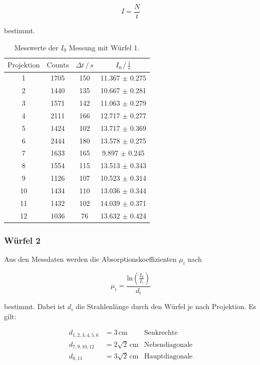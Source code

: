 \begin{equation}
  I = \frac{N}{t}
\end{equation}

\noindent
bestimmt.

\begin{table}
  \centering
  \label{tab:w1}
  \begin{tabular}{c c c c}
  \toprule
  $\text{Projektion}$ & $\text{Counts}$ & $\Delta t \,/\, s $ & $I_0 \,/\, \frac{1}{s} $\\
  \midrule 
    1  & 1705 & 150 & 11.367 $\pm$ 0.275 \\
    2  & 1440 & 135 & 10.667 $\pm$ 0.281 \\
    3  & 1571 & 142 & 11.063 $\pm$ 0.279 \\
    4  & 2111 & 166 & 12.717 $\pm$ 0.277 \\
    5  & 1424 & 102 & 13.717 $\pm$ 0.369 \\
    6  & 2444 & 180 & 13.578 $\pm$ 0.275 \\
    7  & 1633 & 165 & 9.897  $\pm$ 0.245 \\
    8  & 1554 & 115 & 13.513 $\pm$ 0.343 \\
    9  & 1126 & 107 & 10.523 $\pm$ 0.314 \\
    10 & 1434 & 110 & 13.036 $\pm$ 0.344 \\
    11 & 1432 & 102 & 14.039 $\pm$ 0.371 \\
    12 & 1036 &  76 & 13.632 $\pm$ 0.424 \\
  \bottomrule
  \end{tabular}
  \caption{Messwerte der $I_0$ Messung mit Würfel 1.}
  \end{table}




\subsubsection{Würfel 2}

\noindent
Aus den Messdaten werden die Absorptionskoeffizienten $\mu_i$ nach 

\begin{equation}
\mu_i = \frac{\text{ln}(\frac{I_0}{I_i})}{d_i}
\label{eqn:mu}
\end{equation}

\noindent
bestimmt. Dabei ist $d_i$ die Strahlenlänge durch den Würfel je nach Projektion.
Es gilt:

\begin{align*}
d_{1,2,3,4,5,6} &= 3 \, \text{cm}       &\text{Senkrechte}\\
d_{7,9,10,12} &= 2 \sqrt{2} \, \text{cm} &\text{Nebendiagonale}\\
d_{8,11} &= 3 \sqrt{2} \, \text{cm} &\text{Hauptdiagonale}
\end{align*}

